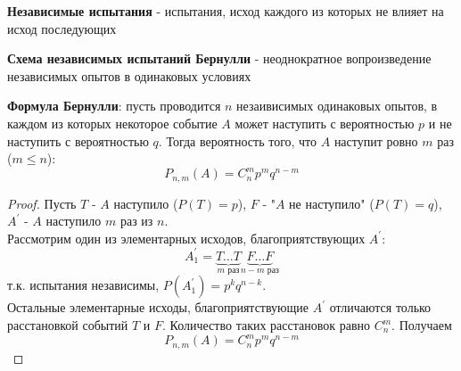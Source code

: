     \begin{opr}
        \textbf{Независимые испытания} - испытания, исход каждого
        из которых не влияет на исход последующих
    \end{opr}

    \begin{opr}
        \textbf{Схема независимых испытаний Бернулли} - неоднократное
        вопроизведение независимых опытов в одинаковых условиях
    \end{opr}

    \begin{thm}
        \textbf{Формула Бернулли}: пусть проводится \(n\) незаивисимых одинаковых опытов, 
        в каждом из которых некоторое событие \(A\) может наступить с вероятностью \(p\) 
        и не наступить с вероятностью \(q\). Тогда вероятность того, что \(A\) наступит 
        ровно \(m\) раз (\(m \leq n\)):
        \begin{equation}
            P_{n, m}(A) = C^{m}_{n} p^{m} q^{n - m}
        \end{equation}

        \begin{proof}
            Пусть \(T\) - \(A\) наступило (\(P(T) = p\)), \(F\) - "\(A\) не наступило" 
            (\(P(T) = q\)), \(A^{'}\) - \( A \) наступило \(m\) раз из \(n\).\\
            Рассмотрим один из элементарных исходов, благоприятствующих 
            \(A^{'}\):
            \begin{equation}
                A_{1}^{'} = \underbrace{T\dots T}_{\text{\(m\) раз}}
                            \underbrace{F\dots F}_{\text{\(n - m\) раз}}
            \end{equation}
            т.к. испытания независимы, \(P(A_{1}^{'}) = p^{k}q^{n - k}\).\\
            Остальные элементарные исходы, благоприятствующие \(A^{'}\)
            отличаются только расстановкой событий \(T\) и \(F\). Количество таких 
            расстановок равно \(C^{m}_{n}\). Получаем
            \begin{equation}
                P_{n, m}(A) = C^{m}_{n} p^{m} q^{n - m}
            \end{equation}
        \end{proof}
    \end{thm}

